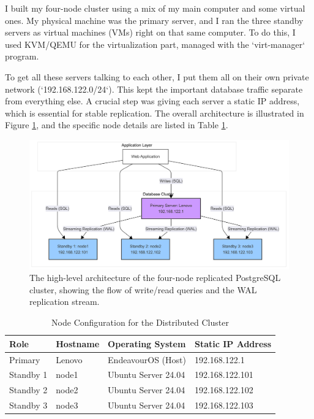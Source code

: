 \documentclass[conference]{IEEEtran}
\begin{document}
I built my four-node cluster using a mix of my main computer and some virtual ones. My physical machine was the primary server, and I ran the three standby servers as virtual machines (VMs) right on that same computer. To do this, I used KVM/QEMU for the virtualization part, managed with the `virt-manager` program.

To get all these servers talking to each other, I put them all on their own private network (`192.168.122.0/24`). This kept the important database traffic separate from everything else. A crucial step was giving each server a static IP address, which is essential for stable replication. The overall architecture is illustrated in Figure \ref{fig:architecture}, and the specific node details are listed in Table \ref{tab:node_config}.

\begin{figure}[!h]
    \centering
    \includegraphics[width=0.9\columnwidth]{./images/architecture-diagram.png}
    \caption{The high-level architecture of the four-node replicated PostgreSQL cluster, showing the flow of write/read queries and the WAL replication stream.}
    \label{fig:architecture}
\end{figure}

\begin{table}[h!]
\centering
\caption{Node Configuration for the Distributed Cluster}
\label{tab:node_config}
\begin{tabular}{l l l l}
\toprule
\textbf{Role} & \textbf{Hostname} & \textbf{Operating System} & \textbf{Static IP Address} \\
\midrule
Primary   & Lenovo & EndeavourOS (Host) & 192.168.122.1 \\
Standby 1 & node1             & Ubuntu Server 24.04  & 192.168.122.101 \\
Standby 2 & node2             & Ubuntu Server 24.04  & 192.168.122.102 \\
Standby 3 & node3             & Ubuntu Server 24.04  & 192.168.122.103 \\
\bottomrule
\end{tabular}
\end{table}
\end{document}
